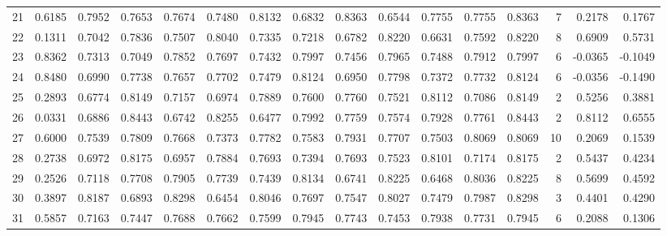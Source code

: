 \begin{tabular}{lrrrrrrrrrrrrrrr}
21  &      0.6185 &  0.7952 &  0.7653 &  0.7674 &  0.7480 &  0.8132 &  0.6832 &  0.8363 &  0.6544 &  0.7755 &   0.7755 &     0.8363 &      7 &                    0.2178 &                     0.1767 \\
22  &      0.1311 &  0.7042 &  0.7836 &  0.7507 &  0.8040 &  0.7335 &  0.7218 &  0.6782 &  0.8220 &  0.6631 &   0.7592 &     0.8220 &      8 &                    0.6909 &                     0.5731 \\
23  &      0.8362 &  0.7313 &  0.7049 &  0.7852 &  0.7697 &  0.7432 &  0.7997 &  0.7456 &  0.7965 &  0.7488 &   0.7912 &     0.7997 &      6 &                   -0.0365 &                    -0.1049 \\
24  &      0.8480 &  0.6990 &  0.7738 &  0.7657 &  0.7702 &  0.7479 &  0.8124 &  0.6950 &  0.7798 &  0.7372 &   0.7732 &     0.8124 &      6 &                   -0.0356 &                    -0.1490 \\
25  &      0.2893 &  0.6774 &  0.8149 &  0.7157 &  0.6974 &  0.7889 &  0.7600 &  0.7760 &  0.7521 &  0.8112 &   0.7086 &     0.8149 &      2 &                    0.5256 &                     0.3881 \\
26  &      0.0331 &  0.6886 &  0.8443 &  0.6742 &  0.8255 &  0.6477 &  0.7992 &  0.7759 &  0.7574 &  0.7928 &   0.7761 &     0.8443 &      2 &                    0.8112 &                     0.6555 \\
27  &      0.6000 &  0.7539 &  0.7809 &  0.7668 &  0.7373 &  0.7782 &  0.7583 &  0.7931 &  0.7707 &  0.7503 &   0.8069 &     0.8069 &     10 &                    0.2069 &                     0.1539 \\
28  &      0.2738 &  0.6972 &  0.8175 &  0.6957 &  0.7884 &  0.7693 &  0.7394 &  0.7693 &  0.7523 &  0.8101 &   0.7174 &     0.8175 &      2 &                    0.5437 &                     0.4234 \\
29  &      0.2526 &  0.7118 &  0.7708 &  0.7905 &  0.7739 &  0.7439 &  0.8134 &  0.6741 &  0.8225 &  0.6468 &   0.8036 &     0.8225 &      8 &                    0.5699 &                     0.4592 \\
30  &      0.3897 &  0.8187 &  0.6893 &  0.8298 &  0.6454 &  0.8046 &  0.7697 &  0.7547 &  0.8027 &  0.7479 &   0.7987 &     0.8298 &      3 &                    0.4401 &                     0.4290 \\
31  &      0.5857 &  0.7163 &  0.7447 &  0.7688 &  0.7662 &  0.7599 &  0.7945 &  0.7743 &  0.7453 &  0.7938 &   0.7731 &     0.7945 &      6 &                    0.2088 &                     0.1306 \\

\end{tabular}
